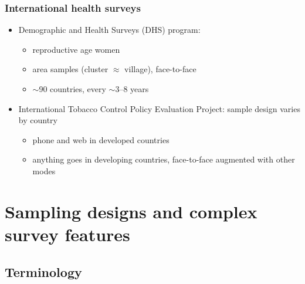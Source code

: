 \documentclass{beamer}
\begin{document}
\begin{frame}\frametitle{International health surveys}

\begin{itemize}
    \item Demographic and Health Surveys (DHS) program:
    \begin{itemize}
        \item reproductive age women
        \item area samples (cluster $\approx$ village), face-to-face
        \item $\sim$90 countries, every $\sim$3--8 years
    \end{itemize}
    \item International Tobacco Control Policy Evaluation Project: sample design varies by country
    \begin{itemize}
        \item phone and web in developed countries
        \item anything goes in developing countries, face-to-face augmented with other modes
    \end{itemize}
\end{itemize}

\end{frame}

\section{Sampling designs and complex survey features}

\subsection{Terminology}
\end{document}
